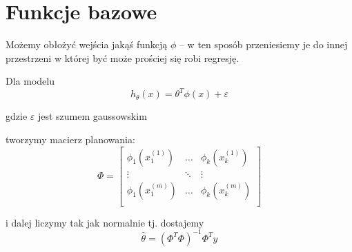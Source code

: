 \section{Funkcje bazowe}

Możemy obłożyć wejścia jakąś funkcją \( \phi \) -- w ten sposób przeniesiemy je do innej przestrzeni w której być może prościej się robi regresję.

Dla modelu
\[
    h_\theta(x) = \theta^T\phi(x) + \varepsilon
\]

gdzie \( \varepsilon \) jest szumem gaussowskim

tworzymy macierz planowania:
\[
 \Phi = \begin{bmatrix}
        \phi_1(x^{(1)}_1) & \hdots & \phi_k(x^{(1)}_k) \\
        \vdots & \ddots & \vdots \\
        \phi_1(x^{(m)}_1) & \hdots & \phi_k(x^{(m)}_k) \\
    \end{bmatrix}
\]

i dalej liczymy tak jak normalnie tj. dostajemy
\[
    \widehat \theta = (\Phi^T\Phi)^{-1}\Phi^T y
\]